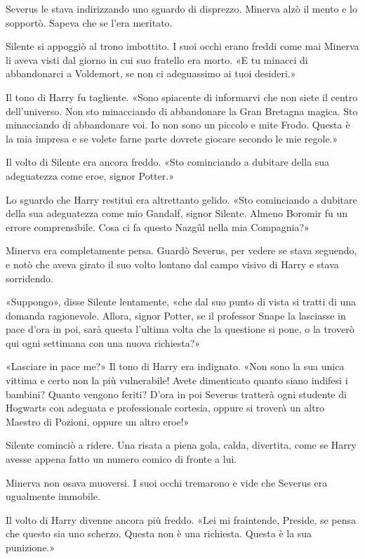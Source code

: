 Severus le stava indirizzando uno sguardo di disprezzo. Minerva alzò il mento e lo sopportò. Sapeva che se l’era meritato.

Silente si appoggiò al trono imbottito. I suoi occhi erano freddi come mai Minerva li aveva visti dal giorno in cui suo fratello era morto. «E tu minacci di abbandonarci a Voldemort, se non ci adeguassimo ai tuoi desideri.»

Il tono di Harry fu tagliente. «Sono spiacente di informarvi che non siete il centro dell’universo. Non sto minacciando di abbandonare la Gran Bretagna magica. Sto minacciando di abbandonare voi. Io non sono un piccolo e mite Frodo. Questa è la mia impresa e se volete farne parte dovrete giocare secondo le mie regole.»

Il volto di Silente era ancora freddo. «Sto cominciando a dubitare della sua adeguatezza come eroe, signor Potter.»

Lo sguardo che Harry restituì era altrettanto gelido. «Sto cominciando a dubitare della sua adeguatezza come mio Gandalf, signor Silente. Almeno Boromir fu un errore comprensibile. Cosa ci fa questo Nazgûl nella mia Compagnia?»

Minerva era completamente persa. Guardò Severus, per vedere se stava seguendo, e notò che aveva girato il suo volto lontano dal campo visivo di Harry e stava sorridendo.

«Suppongo», disse Silente lentamente, «che dal suo punto di vista si tratti di una domanda ragionevole. Allora, signor Potter, se il professor Snape la lasciasse in pace d’ora in poi, sarà questa l’ultima volta che la questione si pone, o la troverò qui ogni settimana con una nuova richiesta?»

«Lasciare in pace me?» Il tono di Harry era indignato. «Non sono la sua unica vittima e certo non la più vulnerabile! Avete dimenticato quanto siano indifesi i bambini? Quanto vengono feriti? D’ora in poi Severus tratterà ogni studente di Hogwarts con adeguata e professionale cortesia, oppure si troverà un altro Maestro di Pozioni, oppure un altro eroe!»

Silente cominciò a ridere. Una risata a piena gola, calda, divertita, come se Harry avesse appena fatto un numero comico di fronte a lui.

Minerva non osava muoversi. I suoi occhi tremarono e vide che Severus era ugualmente immobile.

Il volto di Harry divenne ancora più freddo. «Lei mi fraintende, Preside, se pensa che questo sia uno scherzo. Questa non è una richiesta. Questa è la sua punizione.»


